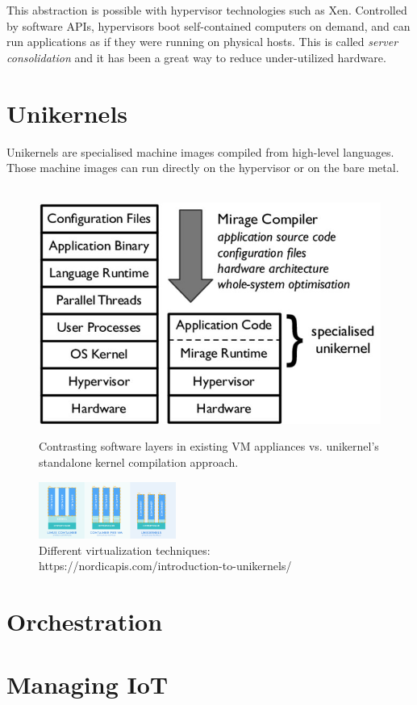 This abstraction is possible with hypervisor technologies such as Xen. Controlled by software APIs, hypervisors boot self-contained computers on demand, and can run applications as if they were running on physical hosts. This is called \textit{server consolidation} and it has been a great way to reduce under-utilized hardware.

\section{Unikernels}
Unikernels \cite{library-operating-system} are specialised machine images compiled from high-level languages. Those machine images can run directly on the hypervisor or on the bare metal. 
\begin{figure}[htpb]
  \
  \includegraphics[height=0.3\textwidth]{figures/Contrasting-software-layers-in-existing-VM-appliances-vs-unikernels-standalone-kernel_W640.jpg} 
  \caption{ Contrasting software layers in existing VM appliances vs. unikernel’s standalone kernel compilation approach. \cite{library-operating-system}} \label{fig:unikernel-arch}
\end{figure}

\begin{figure}[htpb]
    \centering
    \includegraphics[width=0.4\textwidth]{figures/Linux-containers-vms-unikernels.png}
    \caption{Different virtualization techniques: https://nordicapis.com/introduction-to-unikernels/} \label{fig:virt}
  \end{figure}

\section{Orchestration}

\section{Managing IoT}
